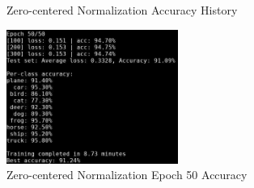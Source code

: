 \begin{itemize}
\begin{figure}[H]
        \caption{Zero-centered Normalization Accuracy History}
    \end{figure}
    \begin{figure}[H]
        \centering
        \includegraphics[width=0.5\textwidth]{media/cnn_zero_epoch_50.png}
        \caption{Zero-centered Normalization Epoch 50 Accuracy}
    \end{figure}
\end{itemize}
